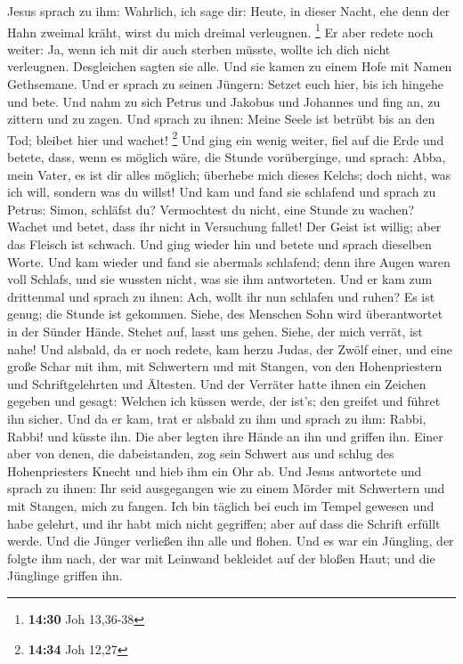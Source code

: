 Jesus sprach zu ihm: Wahrlich, ich sage dir: Heute, in dieser Nacht, ehe
denn der Hahn zweimal kräht, wirst du mich dreimal verleugnen.
\footnote{\textbf{14:30} Joh 13,36-38}  Er aber redete noch
weiter: Ja, wenn ich mit dir auch sterben müsste, wollte ich dich nicht
verleugnen. Desgleichen sagten sie alle.  Und sie kamen zu
einem Hofe mit Namen Gethsemane. Und er sprach zu seinen Jüngern: Setzet
euch hier, bis ich hingehe und bete.  Und nahm zu sich
Petrus und Jakobus und Johannes und fing an, zu zittern und zu zagen.
 Und sprach zu ihnen: Meine Seele ist betrübt bis an den
Tod; bleibet hier und wachet! \footnote{\textbf{14:34} Joh 12,27}
 Und ging ein wenig weiter, fiel auf die Erde und betete,
dass, wenn es möglich wäre, die Stunde vorüberginge,  und
sprach: Abba, mein Vater, es ist dir alles möglich; überhebe mich dieses
Kelchs; doch nicht, was ich will, sondern was du willst! 
Und kam und fand sie schlafend und sprach zu Petrus: Simon, schläfst du?
Vermochtest du nicht, eine Stunde zu wachen?  Wachet und
betet, dass ihr nicht in Versuchung fallet! Der Geist ist willig; aber
das Fleisch ist schwach.  Und ging wieder hin und betete
und sprach dieselben Worte.  Und kam wieder und fand sie
abermals schlafend; denn ihre Augen waren voll Schlafs, und sie wussten
nicht, was sie ihm antworteten.  Und er kam zum drittenmal
und sprach zu ihnen: Ach, wollt ihr nun schlafen und ruhen? Es ist
genug; die Stunde ist gekommen. Siehe, des Menschen Sohn wird
überantwortet in der Sünder Hände.  Stehet auf, lasst uns
gehen. Siehe, der mich verrät, ist nahe!  Und alsbald, da
er noch redete, kam herzu Judas, der Zwölf einer, und eine große Schar
mit ihm, mit Schwertern und mit Stangen, von den Hohenpriestern und
Schriftgelehrten und Ältesten.  Und der Verräter hatte
ihnen ein Zeichen gegeben und gesagt: Welchen ich küssen werde, der
ist's; den greifet und führet ihn sicher.  Und da er kam,
trat er alsbald zu ihm und sprach zu ihm: Rabbi, Rabbi! und küsste ihn.
 Die aber legten ihre Hände an ihn und griffen ihn.
 Einer aber von denen, die dabeistanden, zog sein Schwert
aus und schlug des Hohenpriesters Knecht und hieb ihm ein Ohr ab.
 Und Jesus antwortete und sprach zu ihnen: Ihr seid
ausgegangen wie zu einem Mörder mit Schwertern und mit Stangen, mich zu
fangen.  Ich bin täglich bei euch im Tempel gewesen und
habe gelehrt, und ihr habt mich nicht gegriffen; aber auf dass die
Schrift erfüllt werde.  Und die Jünger verließen ihn alle
und flohen.  Und es war ein Jüngling, der folgte ihm nach,
der war mit Leinwand bekleidet auf der bloßen Haut; und die Jünglinge
griffen ihn.

